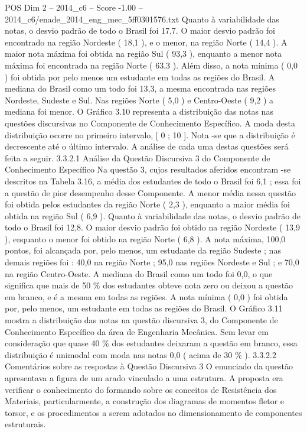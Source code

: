 \begin{textsample}{POS Dim 2 – 2014\_c6 – Score -1.00 – 2014\_c6/enade\_2014\_eng\_mec\_5ff0301576.txt}
Quanto à variabilidade das notas, o desvio padrão de todo o Brasil foi 17,7.
O maior desvio padrão foi encontrado na região Nordeste ( 18,1 ), e o menor, na região Norte ( 14,4 ).
A maior nota máxima foi obtida na região Sul ( 93,3 ), enquanto a menor nota máxima foi encontrada na região Norte ( 63,3 ).
Além disso, a nota mínima ( 0,0 ) foi obtida por pelo menos um estudante em todas as regiões do Brasil.
A mediana do Brasil como um todo foi 13,3, a mesma encontrada nas regiões Nordeste, Sudeste e Sul.
Nas regiões Norte ( 5,0 ) e Centro-Oeste ( 9,2 ) a mediana foi menor.
O Gráfico 3.10 representa a distribuição das notas nas questões discursivas no Componente de Conhecimento Específico.
A moda desta distribuição ocorre no primeiro intervalo, [ 0 ; 10 ].
Nota -se que a distribuição é decrescente até o último intervalo.
A análise de cada uma destas questões será feita a seguir. 3.3.2.1 Análise da Questão Discursiva 3 do Componente de Conhecimento Específico Na questão 3, cujos resultados aferidos encontram -se descritos na Tabela 3.16, a média dos estudantes de todo o Brasil foi 6,1 ; essa foi a questão de pior desempenho desse Componente.
A menor média nessa questão foi obtida pelos estudantes da região Norte ( 2,3 ), enquanto a maior média foi obtida na região Sul ( 6,9 ).
Quanto à variabilidade das notas, o desvio padrão de todo o Brasil foi 12,8.
O maior desvio padrão foi obtido na região Nordeste ( 13,9 ), enquanto o menor foi obtido na região Norte ( 6,8 ).
A nota máxima, 100,0 pontos, foi alcançada por, pelo menos, um estudante da região Sudeste ; nas demais regiões foi : 40,0 na região Norte ; 95,0 nas regiões Nordeste e Sul ; e 70,0 na região Centro-Oeste.
A mediana do Brasil como um todo foi 0,0, o que significa que mais de 50 \% dos estudantes obteve nota zero ou deixou a questão em branco, e é a mesma em todas as regiões.
A nota mínima ( 0,0 ) foi obtida por, pelo menos, um estudante em todas as regiões do Brasil.
O Gráfico 3.11 mostra a distribuição das notas na questão discursiva 3, do Componente de Conhecimento Específico da área de Engenharia Mecânica.
Sem levar em consideração que quase 40 \% dos estudantes deixaram a questão em branco, essa distribuição é unimodal com moda nas notas 0,0 ( acima de 30 \% ). 3.3.2.2 Comentários sobre as respostas à Questão Discursiva 3 O enunciado da questão apresentava a figura de um arado vinculado a uma estrutura.
A proposta era verificar o conhecimento do formando sobre os conceitos de Resistência dos Materiais, particularmente, a construção dos diagramas de momentos fletor e torsor, e os procedimentos a serem adotados no dimensionamento de componentes estruturais.

\end{textsample}
